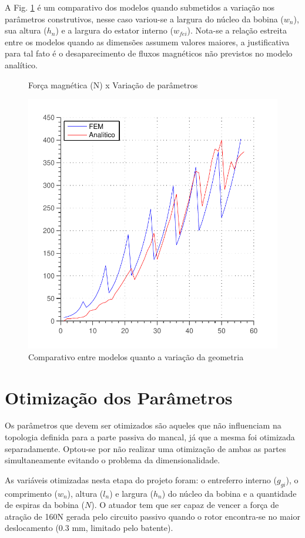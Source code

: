 A Fig. \ref{fig:validacao_ativo_2d} é um comparativo dos modelos quando submetidos a variação nos parâmetros construtivos, nesse caso variou-se a largura do núcleo da bobina ($w_n$), sua altura ($h_n$) e a largura do estator interno ($w_{fei}$). Nota-se a relação estreita entre os modelos quando as dimensões assumem valores maiores, a justificativa para tal fato é o desaparecimento de fluxos magnéticos não previstos no modelo analítico.

\begin{figure}[th]
	\centering
	\caption{Força magnética (N) x Variação de parâmetros}
	\includegraphics[width=0.7\linewidth]{Figs/Simulacoes/Ativo/validacao_ativo_2d}
	\caption{Comparativo entre modelos quanto a variação da geometria}
	\label{fig:validacao_ativo_2d}
\end{figure} 

\section{Otimização dos Parâmetros}

Os parâmetros que devem ser otimizados são aqueles que não influenciam na topologia definida para a parte passiva do mancal, já que a mesma foi otimizada separadamente. Optou-se por não realizar uma otimização de ambas as partes simultaneamente evitando o problema da dimensionalidade.

As variáveis otimizadas nesta etapa do projeto foram:  o entreferro interno ($g_{gi}$), o comprimento ($w_n$), altura ($l_n$) e largura ($h_n$)  do núcleo da bobina e a quantidade de espiras da bobina ($N$). O atuador tem que ser capaz de vencer a força de atração de 160N gerada pelo circuito passivo quando o rotor encontra-se no maior deslocamento (0.3 mm, limitado pelo batente). 

